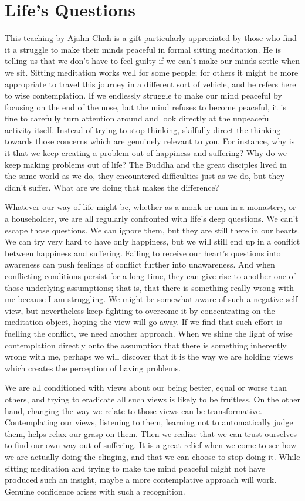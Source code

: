 \section{Life’s Questions}

This teaching by Ajahn Chah is a gift particularly appreciated by those
who find it a struggle to make their minds peaceful in formal sitting
meditation. He is telling us that we don’t have to feel guilty if we
can’t make our minds settle when we sit. Sitting meditation works well
for some people; for others it might be more appropriate to travel this
journey in a different sort of vehicle, and he refers here to wise
contemplation. If we endlessly struggle to make our mind peaceful by
focusing on the end of the nose, but the mind refuses to become
peaceful, it is fine to carefully turn attention around and look
directly at the unpeaceful activity itself. Instead of trying to stop
thinking, skilfully direct the thinking towards those concerns which are
genuinely relevant to you. For instance, why is it that we keep creating
a problem out of happiness and suffering? Why do we keep making problems
out of life? The Buddha and the great disciples lived in the same world
as we do, they encountered difficulties just as we do, but they didn’t
suffer. What are we doing that makes the difference?

Whatever our way of life might be, whether as a monk or nun in a
monastery, or a householder, we are all regularly confronted with life’s
deep questions. We can’t escape those questions. We can ignore them, but
they are still there in our hearts. We can try very hard to have only
happiness, but we will still end up in a conflict between happiness and
suffering. Failing to receive our heart’s questions into awareness can
push feelings of conflict further into unawareness. And when conflicting
conditions persist for a long time, they can give rise to another one of
those underlying assumptions; that is, that there is something really
wrong with me because I am struggling. We might be somewhat aware of
such a negative self-view, but nevertheless keep fighting to overcome it
by concentrating on the meditation object, hoping the view will go away.
If we find that such effort is fuelling the conflict, we need another
approach. When we shine the light of wise contemplation directly onto
the assumption that there is something inherently wrong with me, perhaps
we will discover that it is the way we are holding views which creates
the perception of having problems.

We are all conditioned with views about our being better, equal or worse
than others, and trying to eradicate all such views is likely to be
fruitless. On the other hand, changing the way we relate to those views
can be transformative. Contemplating our views, listening to them,
learning not to automatically judge them, helps relax our grasp on them.
Then we realize that we can trust ourselves to find our own way out of
suffering. It is a great relief when we come to see how we are actually
doing the clinging, and that we can choose to stop doing it. While
sitting meditation and trying to make the mind peaceful might not have
produced such an insight, maybe a more contemplative approach will work.
Genuine confidence arises with such a recognition.

